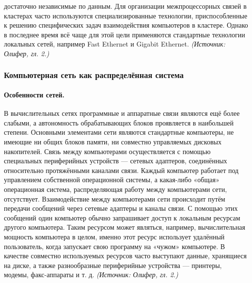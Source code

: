 \documentclass[a4paper,12pt]{article}
\begin{document}
достаточно независимые по данным. Для организации межпроцессорных связей в кластерах часто используются специализированные технологии, приспособленные к решению специфических задач взаимодействия компьютеров в кластере. Однако в последнее время всё чаще для этой цели применяются стандартные технологии локальных сетей, например Fast Ethernet и Gigabit Ethernet.
\textit{(Источник: Олифер, гл. 2.)}

\subsubsection{Компьютерная сеть как распределённая система}

\paragraph{Особенности сетей.}
В вычислительных сетях программные и аппаратные связи являются ещё более слабыми, а автономность обрабатывающих блоков проявляется в наибольшей степени. Основными элементами сети являются стандартные компьютеры, не имеющие ни общих блоков памяти, ни совместно управляемых дисковых накопителей. Связь между компьютерами осуществляется с помощью специальных периферийных устройств — сетевых адаптеров, соединённых относительно протяжёнными каналами связи. Каждый компьютер работает под управлением собственной операционной системы, а какая-либо «общая» операционная система, распределяющая работу между компьютерами сети, отсутствует. Взаимодействие между компьютерами сети происходит путём передачи сообщений через сетевые адаптеры и каналы связи. С помощью этих сообщений один компьютер обычно запрашивает доступ к локальным ресурсам другого компьютера. Таким ресурсом может являться, например, вычислительная мощность компьютера в целом, именно этот ресурс использует удалённый пользователь, когда запускает свою программу на «чужом» компьютере. В качестве совместно используемых ресурсов часто выступают данные, хранящиеся на диске, а также разнообразные периферийные устройства — принтеры, модемы, факс-аппараты и т. д.
\textit{(Источник: Олифер, гл. 2.)}
\end{document}
